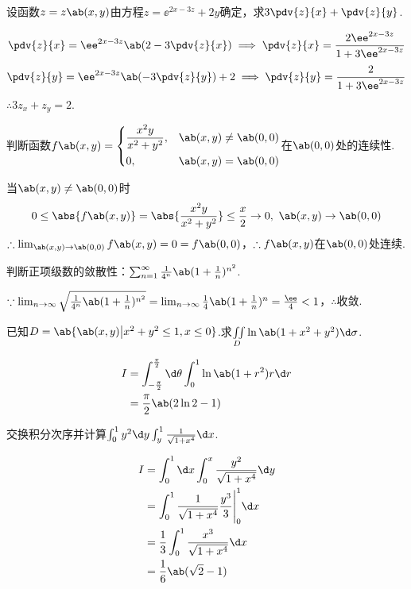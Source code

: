 \begin{exercise}
    设函数$z=z\ab(x,y)$由方程$z=\ee^{2x-3z}+2y$确定，求$3\pdv{z}{x}+\pdv{z}{y}$.
\end{exercise}
\begin{solution}
    $$\pdv{z}{x}=\ee^{2x-3z}\ab(2-3\pdv{z}{x})\implies\pdv{z}{x}=\frac{2\ee^{2x-3z}}{1+3\ee^{2x-3z}}$$
    $$\pdv{z}{y}=\ee^{2x-3z}\ab(-3\pdv{z}{y})+2\implies\pdv{z}{y}=\frac{2}{1+3\ee^{2x-3z}}$$
    $\therefore 3z_x+z_y=2$.
\end{solution}

\begin{exercise}
    判断函数$f\ab(x,y)=\left\{
        \begin{aligned}
            &\frac{x^2y}{x^2+y^2},&&\ab(x,y)\neq\ab(0,0)\\
            &0,&&\ab(x,y)=\ab(0,0)
        \end{aligned}
    \right.$在$\ab(0,0)$处的连续性.
\end{exercise}
\begin{solution}
    当$\ab(x,y)\neq\ab(0,0)$时
    $$0\le\abs{f\ab(x,y)}=\abs{\frac{x^2y}{x^2+y^2}}\le\frac{x}{2}\to 0,\ \ab(x,y)\to\ab(0,0)$$
    $\therefore\lim_{\ab(x,y)\to\ab(0,0)}{f\ab(x,y)}=0=f\ab(0,0)$，$\therefore f\ab(x,y)$在$\ab(0,0)$处连续.
\end{solution}

\begin{exercise}
    判断正项级数的敛散性：$\sum_{n=1}^{\infty}{\frac{1}{4^n}\ab(1+\frac{1}{n})^{n^2}}$.
\end{exercise}
\begin{solution}
    $\because\lim_{n\to\infty}{\sqrt{\frac{1}{4^n}\ab(1+\frac{1}{n})^{n^2}}}=\lim_{n\to\infty}{\frac{1}{4}\ab(1+\frac{1}{n})^n}=\frac{\ee}{4}<1$，$\therefore$收敛.
\end{solution}

\begin{exercise}
    已知$D=\ab{\ab(x,y)\big|x^2+y^2\le 1,x\le 0}$.求$\iint\limits_D{\ln{\ab(1+x^2+y^2)}\d\sigma}$.
\end{exercise}
\begin{solution}
    $$
    \begin{aligned}
        I&=\int_{-\frac{\pi}{2}}^{\frac{\pi}{2}}{\d\theta}\int_0^1{\ln{\ab(1+r^2)}r\d r}\\
        &=\frac{\pi}{2}\ab(2\ln{2}-1)
    \end{aligned}
    $$
\end{solution}

\begin{exercise}
    交换积分次序并计算$\int_0^1{y^2\d y}\int_y^1{\frac{1}{\sqrt{1+x^4}}\d x}$.
\end{exercise}
\begin{solution}
    $$
    \begin{aligned}
        I&=\int_0^1{\d x}\int_0^x{\frac{y^2}{\sqrt{1+x^4}}\d y}\\
        &=\int_0^1{\frac{1}{\sqrt{1+x^4}}\frac{y^3}{3}\Bigg|_0^1\d x}\\
        &=\frac{1}{3}\int_0^1{\frac{x^3}{\sqrt{1+x^4}}\d x}\\
        &=\frac{1}{6}\ab(\sqrt{2}-1)
    \end{aligned}
    $$
\end{solution}

